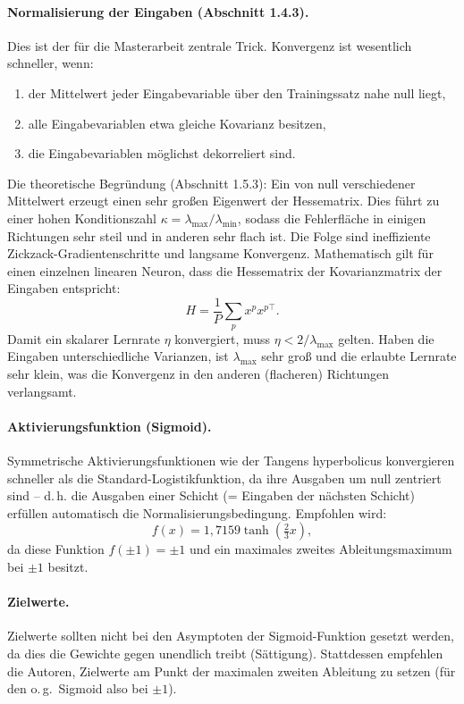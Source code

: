 \documentclass[a4paper,12pt]{article}
\begin{document}
\paragraph{Normalisierung der Eingaben (Abschnitt 1.4.3).}
Dies ist der für die Masterarbeit zentrale Trick. Konvergenz ist wesentlich schneller, wenn:
\begin{enumerate}
    \item der Mittelwert jeder Eingabevariable über den Trainingssatz nahe null liegt,
    \item alle Eingabevariablen etwa gleiche Kovarianz besitzen,
    \item die Eingabevariablen möglichst dekorreliert sind.
\end{enumerate}
Die theoretische Begründung (Abschnitt 1.5.3): Ein von null verschiedener Mittelwert erzeugt einen sehr großen Eigenwert der Hessematrix. Dies führt zu einer hohen Konditionszahl $\kappa = \lambda_{\max}/\lambda_{\min}$, sodass die Fehlerfläche in einigen Richtungen sehr steil und in anderen sehr flach ist. Die Folge sind ineffiziente Zickzack-Gradienten\-schritte und langsame Konvergenz. Mathematisch gilt für einen einzelnen linearen Neuron, dass die Hessematrix der Kovarianzmatrix der Eingaben entspricht:
\[
    H = \frac{1}{P} \sum_p x^p x^{p\top}.
\]
Damit ein skalarer Lernrate $\eta$ konvergiert, muss $\eta < 2/\lambda_{\max}$ gelten. Haben die Eingaben unterschiedliche Varianzen, ist $\lambda_{\max}$ sehr groß und die erlaubte Lernrate sehr klein, was die Konvergenz in den anderen (flacheren) Richtungen verlangsamt.

\paragraph{Aktivierungsfunktion (Sigmoid).}
Symmetrische Aktivierungsfunktionen wie der Tangens hyperbolicus konvergieren schneller als die Standard-Logistikfunktion, da ihre Ausgaben um null zentriert sind -- d.\,h. die Ausgaben einer Schicht (= Eingaben der nächsten Schicht) erfüllen automatisch die Normalisierungsbedingung. Empfohlen wird:
\[
    f(x) = 1{,}7159 \tanh\!\left(\tfrac{2}{3}x\right),
\]
da diese Funktion $f(\pm 1) = \pm 1$ und ein maximales zweites Ableitungsmaximum bei $\pm 1$ besitzt.

\paragraph{Zielwerte.}
Zielwerte sollten nicht bei den Asymptoten der Sigmoid-Funktion gesetzt werden, da dies die Gewichte gegen unendlich treibt (Sättigung). Stattdessen empfehlen die Autoren, Zielwerte am Punkt der maximalen zweiten Ableitung zu setzen (für den o.\,g.\ Sigmoid also bei $\pm 1$).
\end{document}
